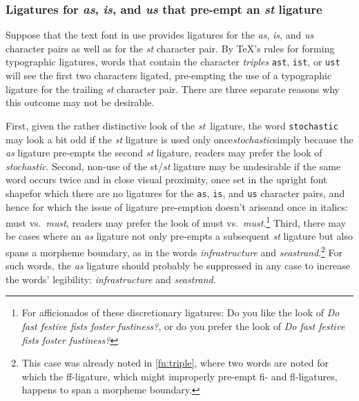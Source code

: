 \documentclass[12pt]{article}
\newcommand{\opt}[1]{\texttt{#1}}
\begin{document}
\subsubsection{Ligatures for \emph{as}, \emph{is}, and \emph{us} that pre-empt an \emph{st} ligature}

Suppose that the text font in use provides ligatures for the \emph{as}, \emph{is}, and \emph{us} character pairs as well as for the \emph{st} character pair. By TeX's rules for forming typographic ligatures, words that contain the character \emph{triples} \opt{ast}, \opt{ist}, or \opt{ust} will see the first two characters ligated, pre-empting the use of a typographic ligature for the trailing \emph{st} character pair. There are three separate reasons why this outcome may not be desirable.

First, given the rather distinctive look of the \emph{st}~ligature, the word \opt{stochastic} may look a bit odd if the \emph{st} ligature is used only once\textemdash\emph{stoch\mbox{as}tic}\textemdash simply because the \emph{as} ligature pre-empts the second \emph{st} ligature, readers may prefer the look of \emph{stocha\mbox{st}ic}. Second, non-use of the st/\emph{st} ligature may be undesirable if the same word occurs twice and in close visual proximity, once set in the upright font shape\textemdash for which there are no ligatures for the \opt{as}, \opt{is}, and \opt{us} character pairs, and hence for which the issue of ligature pre-emption doesn't arise\textemdash and once in italics: must vs.\ \emph{m\mbox{us}t}, readers may prefer the look of must vs.\ \emph{mu\mbox{st}}.\footnote{For afficionados of these discretionary ligatures: Do you like the look of \emph{Do f\mbox{as}t festive f\mbox{is}ts foster f\mbox{us}tiness?}, or do you prefer the look of \emph{Do fa\mbox{st} festive fi\mbox{st}s foster fu\mbox{st}iness?}} Third, there may be cases where an \emph{as} ligature not only pre-empts a subsequent \emph{st} ligature but also spans a morpheme boundary, as in the words \emph{infr\mbox{as}tructure} and \emph{se\mbox{as}trand}.\footnote{This case was already noted in \cref{fn:triple}, where two words are noted for which the ff-ligature, which might improperly pre-empt fi- and fl-ligatures, happens to span a morpheme boundary.} For such words, the \emph{as} ligature should probably be suppressed in any case to increase the words' legibility: \emph{infra\mbox{st}ructure} and \emph{sea\mbox{st}rand}.
\end{document}
